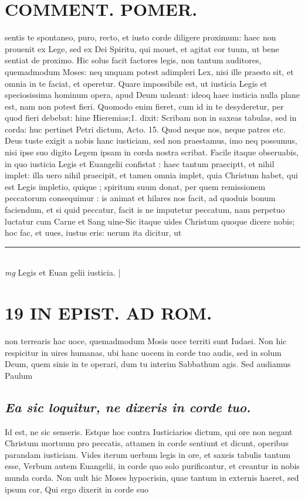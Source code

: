 \documentclass{article}
\begin{document}
\begin{pages}
\section*{COMMENT. POMER.  }\pstart sentis te spontaneo, puro, recto, et iusto corde diligere proximum: haec non prouenit ex Lege, sed ex Dei Spiritu, qui mouet, et agitat cor tuum, ut bene sentiat de proximo. Hic solus facit factores legis, non tantum auditores, quemadmodum Moses: neq unquam potest adimpleri Lex, nisi ille praesto sit, et omnia in te faciat, et operetur. Quare impossibile est, ut iusticia Legis et speciosissima hominum opera, apud Deum ualeant: ideoq haec iusticia nulla plane est, nam non potest fieri. Quomodo enim fieret, cum id in te desyderetur, per quod fieri debebat: hine Hieremias;1. dixit: Scribam non in saxeas tabulas, sed in corda: huc pertinet Petri dictum, Acto. 15.  Quod neque nos, neque patres etc. Deus tuste exigit a nobis hanc iusticiam, sed non praestamus, imo neq possumus, nisi ipse suo digito Legem ipsam in corda nostra scribat. Facile itaque obseruabis, in quo iusticia Legis et Euangelii confistat : haec tantum praeciptt, et nihil implet: illa uero nihil praecipit, et tamen omnia implet, quia Christum habet, qui est Legis impletio, quique ; spiritum suum donat, per quem remissionem peccatorum consequimur : is animat et hilares nos facit, ad quoduis bonum faciendum, et si quid peccatur, facit is ne imputetur peccatum, nam perpetuo luctatur cum Carne et Sang uine-Sic itaque uides Christum quoque dicere nobis; hoc fac, et uues, iustus eris: uerum ita dicitur, ut  \pend
\vspace{0.5cm}\noindent
\vspace{0.2cm}\rule{1cm}{0.2pt}\\ 
\hspace{0.2cm}\textit{mg}
\footnotesize Legis et Euan gelii iusticia.  
\normalsize| 
\section*{19 IN EPIST. AD ROM.  }
\marginpar{[ p.]}\pstart non terrearis hac uoce, quemadmodum Mosis uoce territi sunt Iudaei. Non hic respicitur in uires humanas, ubi hanc uocem in corde tuo audis, sed in solum Deum, quem sinis in te operari, dum tu interim Sabbathum agis. Sed audiamus Paulum\pend
{}
{}
\subsection*{\textit{Ea sic loquitur, ne dixeris in corde tuo. }}\pstart Id est, ne sic senseris. Estque hoc contra Iusticiarios dictum, qui ore non negant Christum mortuum pro peccatis, attamen in corde sentiunt et dicunt, operibus parandam iusticiam. Vides iterum uerbum legis in ore, et saxeis tabulis tantum esse, Verbum autem Euangelii, in corde quo solo purificantur, et creantur in nobis munda corda. Non uult hic Moses hypocrisin, quae tantum in externis haeret, sed ipsum cor, Qui ergo dixerit in corde suo  \pend
{}
{}

\end{pages}
\end{document}
